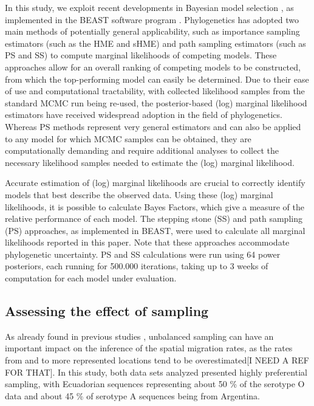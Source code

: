 \documentclass[10pt]{article}
\begin{document}
In this study, we exploit recent developments in Bayesian model selection \cite{Baele2012}, as implemented in the BEAST software program \cite{BEAST}.
Phylogenetics has adopted two main methods of potentially general applicability, such as importance sampling estimators (such as the HME and sHME) and path sampling estimators (such as PS and SS) to compute marginal likelihoods of competing models.
These approaches allow for an overall ranking of competing models to be constructed, from which the top-performing model can easily be determined.
Due to their ease of use and computational tractability, with collected likelihood samples from the standard MCMC run being re-used, the posterior-based (log) marginal likelihood estimators have received widespread adoption in the field of phylogenetics.
Whereas PS methods represent very general estimators and can also be applied to any model for which MCMC samples can be obtained, they are computationally demanding and require additional analyses to collect the necessary likelihood samples needed to estimate the (log) marginal likelihood.

Accurate estimation of (log) marginal likelihoods are crucial to correctly identify models that best describe the observed data. 
Using these (log) marginal likelihoods, it is possible to calculate Bayes Factors, which give a measure of the relative performance of each model. 
The stepping stone (SS) and path sampling (PS) approaches, as implemented in BEAST, were used  to calculate all marginal likelihoods reported in this paper.
Note that these approaches accommodate phylogenetic uncertainty.
PS and SS calculations were run using 64 power posteriors, each running for 500.000 iterations, taking up to 3 weeks of computation for each model under evaluation.



\subsection*{Assessing the effect of sampling}

As already found in previous studies \cite{Faria2012, Lemey2013}, unbalanced sampling can have an important impact on the inference of the spatial migration rates, as the rates from and to more represented locations tend to be overestimated[I NEED A REF FOR THAT]. In this study, both data sets analyzed presented highly preferential sampling, with Ecuadorian sequences representing about 50 \% of the serotype O data and about 45 \% of serotype A sequences being from Argentina.
\end{document}
